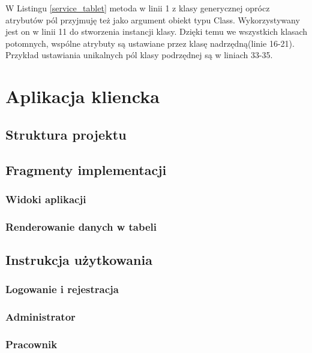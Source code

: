 W Listingu \ref{service_tablet} metoda w linii 1 z klasy generycznej oprócz atrybutów pól przyjmuję też jako argument obiekt typu Class. Wykorzystywany jest on w linii 11 do stworzenia instancji klasy. Dzięki temu we wszystkich klasach potomnych, wspólne atrybuty są ustawiane przez klasę nadrzędną(linie 16-21). Przykład ustawiania unikalnych pól klasy podrzędnej są w liniach 33-35.


\section {Aplikacja kliencka}

\subsection{Struktura projektu}


\subsection{Fragmenty implementacji}
\subsubsection{Widoki aplikacji}
\subsubsection{Renderowanie danych w tabeli}

\subsection{Instrukcja użytkowania}
\subsubsection{Logowanie i rejestracja}

\subsubsection{Administrator}
\subsubsection{Pracownik}



